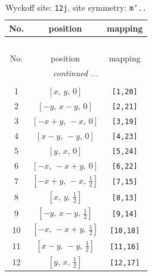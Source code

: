 \documentclass[fleqn,8pt]{jsarticle}
\begin{document}
\begin{longtable}{ccc}
\caption{Wyckoff site: {\tt 12j}, site symmetry: {\tt m'..}}
 \\
 \hline \hline
No. & position & mapping \\ \hline \endfirsthead

\multicolumn{2}{l}{\tablename\ \thetable{}} \\
 \hline \hline
No. & position & mapping \\ \hline \endhead

 \hline \hline
\multicolumn{2}{r}{\footnotesize\it continued ...} \\ \endfoot

 \hline \hline
\multicolumn{2}{r}{} \\ \endlastfoot

1 & $\left[ x,\, y,\, 0 \right]$ & {\tt [1,20]} \\ \hline
2 & $\left[ - y,\, x - y,\, 0 \right]$ & {\tt [2,21]} \\ \hline
3 & $\left[ - x + y,\, - x,\, 0 \right]$ & {\tt [3,19]} \\ \hline
4 & $\left[ x - y,\, - y,\, 0 \right]$ & {\tt [4,23]} \\ \hline
5 & $\left[ y,\, x,\, 0 \right]$ & {\tt [5,24]} \\ \hline
6 & $\left[ - x,\, - x + y,\, 0 \right]$ & {\tt [6,22]} \\ \hline
7 & $\left[ - x + y,\, - x,\, \frac{1}{2} \right]$ & {\tt [7,15]} \\ \hline
8 & $\left[ x,\, y,\, \frac{1}{2} \right]$ & {\tt [8,13]} \\ \hline
9 & $\left[ - y,\, x - y,\, \frac{1}{2} \right]$ & {\tt [9,14]} \\ \hline
10 & $\left[ - x,\, - x + y,\, \frac{1}{2} \right]$ & {\tt [10,18]} \\ \hline
11 & $\left[ x - y,\, - y,\, \frac{1}{2} \right]$ & {\tt [11,16]} \\ \hline
12 & $\left[ y,\, x,\, \frac{1}{2} \right]$ & {\tt [12,17]} \\
\end{longtable}
\renewcommand{\arraystretch}{1.2}
\end{document}
